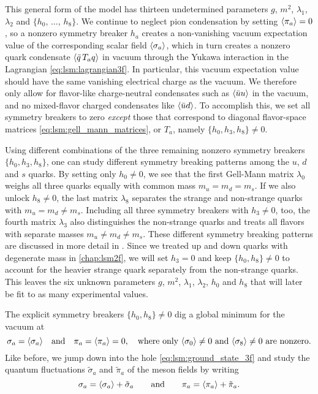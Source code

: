 This general form of the model has thirteen undetermined parameters $g$, $m^2$, $\lambda_1$, $\lambda_2$ and $\{h_0,\,\ldots,\,h_8\}$.
We continue to neglect pion condensation by setting $\langle \pi_a \rangle=0$,
so a nonzero symmetry breaker $h_a$ creates a non-vanishing vacuum expectation value of the corresponding scalar field $\langle \sigma_a \rangle$,
which in turn creates a nonzero quark condensate $\langle \bar{q} \, T_a q \rangle$ in vacuum through the Yukawa interaction in the Lagrangian \eqref{eq:lsm:lagrangian3f}.
In particular, this vacuum expectation value should have the same vanishing electrical charge as the vacuum.
We therefore only allow for flavor-like charge-neutral condensates such as $\langle \bar{u} u \rangle$ in the vacuum,
and no mixed-flavor charged condensates like $\langle \bar{u} d \rangle$.
To accomplish this, we set all symmetry breakers to zero \emph{except} those that correspond to diagonal flavor-space matrices \eqref{eq:lsm:gell_mann_matrices},
or $T_a$,
namely $\{h_0,h_3,h_8\} \neq 0$.

Using different combinations of the three remaining nonzero symmetry breakers $\{h_0,h_3,h_8\}$,
one can study different symmetry breaking patterns among the $u$, $d$ and $s$ quarks.
By setting only $h_0 \neq 0$, we see that the first Gell-Mann matrix $\lambda_0$ weighs all three quarks equally with common mass $m_u=m_d=m_s$.
If we also unlock $h_8 \neq 0$, the last matrix $\lambda_8$ separates the strange and non-strange quarks with $m_u = m_d \neq m_s$.
Including all three symmetry breakers with $h_3 \neq 0$, too, the fourth matrix $\lambda_3$ also distinguishes the non-strange quarks and treats all flavors with separate masses $m_u \neq m_d \neq m_s$.
These different symmetry breaking patterns are discussed in more detail in \cite[section III]{ref:lsm3f_details}.
Since we treated up and down quarks with degenerate mass in \cref{chap:lsm2f},
we will set $h_3 = 0$ and keep $\{h_0,h_8\} \neq 0$ to account for the heavier strange quark separately from the non-strange quarks.
This leaves the six unknown parameters $g$, $m^2$, $\lambda_1$, $\lambda_2$, $h_0$ and $h_8$ that will later be fit to as many experimental values.

The explicit symmetry breakers $\{h_0,h_8\}\neq 0$ dig a global minimum for the vacuum at
\begin{equation}
	\sigma_a = \langle \sigma_a \rangle \quad \text{and} \quad \pi_a = \langle \pi_a \rangle = 0, \quad \text{where only $\langle \sigma_0 \rangle \neq 0$ and $\langle \sigma_8 \rangle \neq 0$ are nonzero.}
\label{eq:lsm:ground_state_3f}
\end{equation}
Like before, we jump down into the hole \eqref{eq:lsm:ground_state_3f} and study the quantum fluctuations $\tilde{\sigma}_a$ and $\tilde{\pi}_a$ of the meson fields by writing
\begin{equation}
	\sigma_a = \langle \sigma_a \rangle + \tilde{\sigma}_a
	\qquad \text{and} \qquad
	\pi_a = \langle \pi_a \rangle + \tilde{\pi}_a.
\end{equation}

